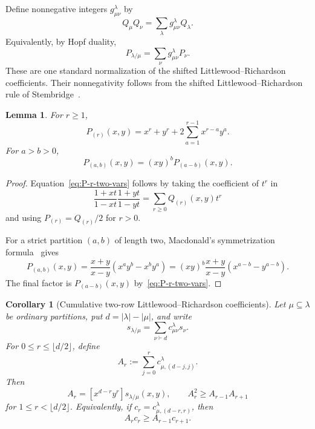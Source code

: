 \documentclass[11pt,a4paper,oneside]{amsart}
\numberwithin{equation}{section}
\newtheorem{corollary}[theorem]{Corollary}
\newtheorem{lemma}[theorem]{Lemma}
\theoremstyle{definition}
\theoremstyle{remark}
\begin{document}
Define nonnegative integers $g_{\mu\nu}^{\lambda}$ by
\begin{equation}\label{eq:shifted-LR-def}
 Q_\mu Q_\nu=\sum_\lambda g_{\mu\nu}^{\lambda}Q_\lambda.
\end{equation}
Equivalently, by Hopf duality,
\begin{equation}\label{eq:skew-P-expansion}
 P_{\lambda/\mu}=\sum_\nu g_{\mu\nu}^{\lambda}P_\nu.
\end{equation}
These are one standard normalization of the shifted Littlewood--Richardson coefficients.  Their nonnegativity follows from the shifted Littlewood--Richardson rule of Stembridge~\cite[Theorem~8.3]{Stembridge89}.

\begin{lemma}\label{lem:P-two-variable}
For $r\geq1$,
\begin{equation}\label{eq:P-r-two-vars}
 P_{(r)}(x,y)=x^r+y^r+2\sum_{a=1}^{r-1}x^{r-a}y^a.
\end{equation}
For $a>b>0$,
\begin{equation}\label{eq:P-ab-two-vars}
 P_{(a,b)}(x,y)=(xy)^bP_{(a-b)}(x,y).
\end{equation}
\end{lemma}

\begin{proof}
Equation~\eqref{eq:P-r-two-vars} follows by taking the coefficient of $t^r$ in
\[
 \frac{1+xt}{1-xt}\frac{1+yt}{1-yt}
 =\sum_{r\geq0}Q_{(r)}(x,y)t^r
\]
and using $P_{(r)}=Q_{(r)}/2$ for $r>0$.

For a strict partition $(a,b)$ of length two, Macdonald's symmetrization formula~\cite[Chapter~III, (8.3)]{Macdonald} gives
\[
 P_{(a,b)}(x,y)
 =\frac{x+y}{x-y}\left(x^ay^b-x^by^a\right)
 =(xy)^b\frac{x+y}{x-y}\left(x^{a-b}-y^{a-b}\right).
\]
The final factor is $P_{(a-b)}(x,y)$ by~\eqref{eq:P-r-two-vars}.
\end{proof}


\begin{corollary}[Cumulative two-row Littlewood--Richardson coefficients]\label{cor:ordinary-two-row-LR}
Let $\mu\subseteq\lambda$ be ordinary partitions, put $d=|\lambda|-|\mu|$, and write
\[
 s_{\lambda/\mu}=\sum_{\nu\vdash d}c_{\mu\nu}^{\lambda}s_\nu.
\]
For $0\leq r\leq\lfloor d/2\rfloor$, define
\[
 A_r:=\sum_{j=0}^r c_{\mu,(d-j,j)}^{\lambda}.
\]
Then
\begin{equation}\label{eq:ordinary-LR-cumulative}
 A_r=[x^{d-r}y^r]s_{\lambda/\mu}(x,y),
 \qquad
 A_r^2\geq A_{r-1}A_{r+1}
\end{equation}
for $1\leq r<\lfloor d/2\rfloor$.  Equivalently, if
$c_r=c_{\mu,(d-r,r)}^{\lambda}$, then
\begin{equation}\label{eq:ordinary-LR-increment}
 A_rc_r\geq A_{r-1}c_{r+1}.
\end{equation}
\end{corollary}
\end{document}
